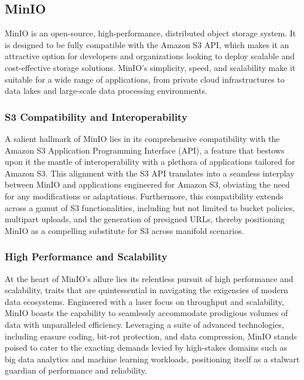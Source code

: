 
\subsection{MinIO}
MinIO is an open-source, high-performance, distributed object storage system. It
is designed to be fully compatible with the Amazon S3 API, which makes it an
attractive option for developers and organizations looking to deploy scalable
and cost-effective storage solutions. MinIO's simplicity, speed, and scalability
make it suitable for a wide range of applications, from private cloud
infrastructures to data lakes and large-scale data processing environments.

\subsubsection{S3 Compatibility and Interoperability}
A salient hallmark of MinIO lies in its comprehensive compatibility with the
Amazon S3 Application Programming Interface (API), a feature that bestows upon
it the mantle of interoperability with a plethora of applications tailored for
Amazon S3. This alignment with the S3 API translates into a seamless interplay
between MinIO and applications engineered for Amazon S3, obviating the need for
any modifications or adaptations. Furthermore, this compatibility extends across
a gamut of S3 functionalities, including but not limited to bucket policies,
multipart uploads, and the generation of presigned URLs, thereby positioning
MinIO as a compelling substitute for S3 across manifold scenarios.

\subsubsection{High Performance and Scalability}
At the heart of MinIO's allure lies its relentless pursuit of high performance
and scalability, traits that are quintessential in navigating the exigencies of
modern data ecosystems. Engineered with a laser focus on throughput and
scalability, MinIO boasts the capability to seamlessly accommodate prodigious
volumes of data with unparalleled efficiency. Leveraging a suite of advanced
technologies, including erasure coding, bit-rot protection, and data
compression, MinIO stands poised to cater to the exacting demands levied by
high-stakes domains such as big data analytics and machine learning workloads,
positioning itself as a stalwart guardian of performance and reliability.

